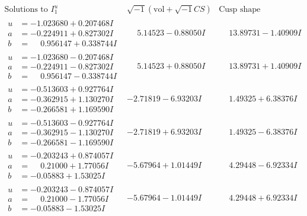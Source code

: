 \documentclass[1p]{elsarticle_modified}
\theoremstyle{definition}
\newcommand{\I}{\sqrt{-1}}
\begin{document}
$$\begin{array}{c|c|c}  
\text{Solutions to }I^u_{1}& \I (\text{vol} + \sqrt{-1}CS) & \text{Cusp shape}\\
 \hline 
\begin{aligned}
u &= -1.023680 + 0.207468 I \\
a &= -0.224911 + 0.827302 I \\
b &= \phantom{-}0.956147 + 0.338744 I\end{aligned}
 & \phantom{-}5.14523 - 0.88050 I & \phantom{-}13.89731 - 1.40909 I \\ \hline\begin{aligned}
u &= -1.023680 - 0.207468 I \\
a &= -0.224911 - 0.827302 I \\
b &= \phantom{-}0.956147 - 0.338744 I\end{aligned}
 & \phantom{-}5.14523 + 0.88050 I & \phantom{-}13.89731 + 1.40909 I \\ \hline\begin{aligned}
u &= -0.513603 + 0.927764 I \\
a &= -0.362915 + 1.130270 I \\
b &= -0.266581 + 1.169590 I\end{aligned}
 & -2.71819 - 6.93203 I & \phantom{-}1.49325 + 6.38376 I \\ \hline\begin{aligned}
u &= -0.513603 - 0.927764 I \\
a &= -0.362915 - 1.130270 I \\
b &= -0.266581 - 1.169590 I\end{aligned}
 & -2.71819 + 6.93203 I & \phantom{-}1.49325 - 6.38376 I \\ \hline\begin{aligned}
u &= -0.203243 + 0.874057 I \\
a &= \phantom{-}0.21000 + 1.77056 I \\
b &= -0.05883 + 1.53025 I\end{aligned}
 & -5.67964 + 1.01449 I & \phantom{-}4.29448 - 6.92334 I \\ \hline\begin{aligned}
u &= -0.203243 - 0.874057 I \\
a &= \phantom{-}0.21000 - 1.77056 I \\
b &= -0.05883 - 1.53025 I\end{aligned}
 & -5.67964 - 1.01449 I & \phantom{-}4.29448 + 6.92334 I \\ \hline\begin{aligned}

\end{aligned}
\end{array}$$
\end{document}
